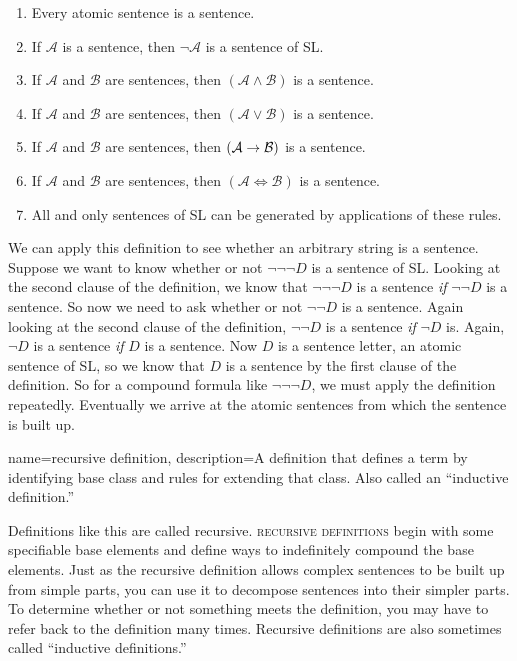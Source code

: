 {\begin{enumerate}
\item Every atomic sentence is a sentence.
\item If $\mathcal{A}$ is a sentence, then $\lnot\mathcal{A}$ is a sentence of SL.
\item If $\mathcal{A}$ and $\mathcal{B}$ are sentences, then $(\mathcal{A}\land\mathcal{B})$ is a sentence.
\item If $\mathcal{A}$ and $\mathcal{B}$ are sentences, then $(\mathcal{A}\lor\mathcal{B})$ is a sentence.
\item If $\mathcal{A}$ and $\mathcal{B}$ are sentences, then $(\mathcal{A}\mathrel{\rightarrow}\mathcal{B})$ is a sentence.
\item If $\mathcal{A}$ and $\mathcal{B}$ are sentences, then $(\mathcal{A}\iff\mathcal{B})$ is a sentence.
\item All and only sentences of SL can be generated by applications of these rules.
\end{enumerate}

We can apply this definition to see whether an arbitrary string is a sentence. Suppose we want to know whether or not $\lnot\lnot\lnot D$ is a sentence of SL.
Looking at the second clause of the definition, we know that $\lnot\lnot\lnot D$ is a sentence \emph{if} $\lnot\lnot D$ is a sentence.
So now we need to ask whether or not $\lnot\lnot D$ is a sentence.
Again looking at the second clause of the definition, $\lnot\lnot D$ is a sentence \emph{if} $\lnot D$ is.
Again, $\lnot D$ is a sentence \emph{if} $D$ is a sentence.
Now $D$ is a sentence letter, an atomic sentence of SL, so we know that $D$ is a sentence by the first clause of the definition.
So for a compound formula like $\lnot\lnot\lnot D$, we must apply the definition repeatedly. Eventually we arrive at the atomic sentences from which the sentence is built up.

{
name=recursive definition,
description={A definition that defines a term by identifying base class and rules for extending that class. Also called an ``inductive definition.''}
}

Definitions like this are called recursive. \textsc{\Glspl{recursive definition}}\label{def:recursive_definition} begin with some specifiable base elements and define ways to indefinitely compound the base elements. Just as the recursive definition allows complex sentences to be built up from simple parts, you can use it to decompose sentences into their simpler parts. To determine whether or not something meets the definition, you may have to refer back to the definition many times. Recursive definitions are also sometimes called ``inductive definitions.''

}
